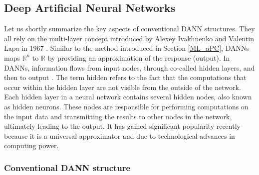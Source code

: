\documentclass[a4paper,fleqn]{article}
\newcommand{\rw}[1]{\textcolor{blue}{#1}}
\renewcommand{\rw}[1]{#1}
\begin{document}
\subsection{Deep Artificial Neural Networks}
\label{ML_DANN}

Let us shortly summarize the key aspects of conventional DANN structures. They all rely on  the multi-layer concept introduced by Alexey Ivakhnenko and Valentin Lapa in 1967 \cite{ivakhnenko1967cybernetics}. Similar to \rw{the method introduced in} Section \ref{ML_aPC}, DANNs maps $\mathbb{R}^n$ to $\mathbb{R}$ by providing an approximation of the response (output). 
\rw{In DANNs, information flows from input nodes, through co-called hidden layers, and then to output \cite{Goodfellow2016deeplearning}. The term hidden refers to the fact that the computations that occur within the hidden layer are not visible from the outside of the network. Each hidden layer in a neural network contains several hidden nodes, also known as hidden neurons. These nodes are responsible for performing computations on the input data and transmitting the results to other nodes in the network, ultimately leading to the output.}
It has gained significant popularity recently because it is a universal approximator \cite{hornik1989universal} and due to technological advances in computing power.

\subsubsection{Conventional DANN structure}
\end{document}
